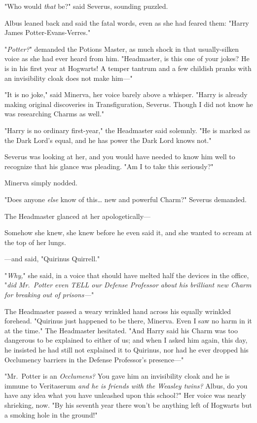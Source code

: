 "Who would \emph{that} be?" said Severus, sounding puzzled.

Albus leaned back and said the fatal words, even as she had feared them: "Harry
James Potter-Evans-Verres."

"\emph{Potter?}" demanded the Potions Master, as much shock in that
usually-silken voice as she had ever heard from him. "Headmaster, is this one
of your jokes? He is in his first year at Hogwarts! A temper tantrum and a few
childish pranks with an invisibility cloak does not make him---"

"It is no joke," said Minerva, her voice barely above a whisper. "Harry is
already making original discoveries in Transfiguration, Severus. Though I did
not know he was researching Charms as well."

"Harry is no ordinary first-year," the Headmaster said solemnly. "He is marked
as the Dark Lord's equal, and he has power the Dark Lord knows not."

Severus was looking at her, and you would have needed to know him well to
recognize that his glance was pleading. "Am I to take this seriously?"

Minerva simply nodded.

"Does anyone \emph{else} know of this{\ldots} new and powerful Charm?" Severus
demanded.

The Headmaster glanced at her apologetically---

Somehow she knew, she knew before he even said it, and she wanted to scream at
the top of her lungs.

---and said, "Quirinus Quirrell."

"\emph{Why,}" she said, in a voice that should have melted half the devices in
the office, "\emph{did Mr.~Potter even TELL our Defense Professor about his
brilliant new Charm for breaking out of prisons---}"

The Headmaster passed a weary wrinkled hand across his equally wrinkled
forehead. "Quirinus just happened to be there, Minerva. Even I saw no harm in
it at the time." The Headmaster hesitated. "And Harry said his Charm was too
dangerous to be explained to either of us; and when I asked him again, this
day, he insisted he had still not explained it to Quirinus, nor had he ever
dropped his Occlumency barriers in the Defense Professor's presence---"

"Mr.~Potter is an \emph{Occlumens?} You gave him an invisibility cloak and he
is immune to Veritaserum \emph{and he is friends with the Weasley twins?}
Albus, do you have any idea what you have unleashed upon this school?" Her
voice was nearly shrieking, now. "By his seventh year there won't be anything
left of Hogwarts but a smoking hole in the ground!"

